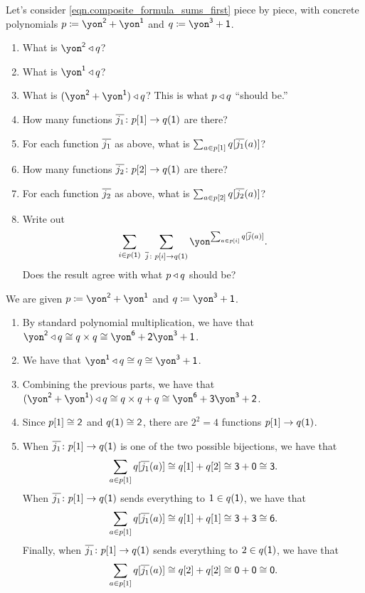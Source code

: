 \documentclass[Book-Poly]{subfiles}
\begin{document}
\begin{exercise}
Let's consider \eqref{eqn.composite_formula_sums_first} piece by piece, with concrete polynomials $p\coloneqq\yon^\2+\yon^\1$ and $q\coloneqq \yon^\3+\1$.
\begin{enumerate}
	\item What is $\yon^\2\tri q$?
	\item What is $\yon^\1\tri q$?
	\item What is $(\yon^\2+\yon^\1)\tri q$? This is what $p\mathbin{\triangleleft} q$ ``should be.''
	\item How many functions $\overline{j_1}\colon p[1]\to q(\textsf{1})$ are there?
	\item For each function $\overline{j_1}$ as above, what is $\sum_{a\in p[1]} q[\overline{j_1}(a)]$?
	\item How many functions $\overline{j_2}\colon p[2]\to q(\textsf{1})$ are there?
	\item For each function $\overline{j_2}$ as above, what is $\sum_{a\in p[2]} q[\overline{j_2}(a)]$?
	\item Write out \[\sum_{i\in p(\1)}\;\sum_{\ol{j}\colon p[i]\to q(\1)}\yon^{\sum_{a\in p[i]}q[\ol{j}(a)]}.\]
	Does the result agree with what $p\mathbin{\triangleleft} q$ should be?
\qedhere
\end{enumerate}
\begin{solution}
We are given $p\coloneqq\yon^\2+\yon^\1$ and $q\coloneqq \yon^\3+\1$.
\begin{enumerate}
    \item By standard polynomial multiplication, we have that $\yon^\2 \tri q \iso q \times q \iso \yon^\6 + \2\yon^\3 + \1$.
    \item We have that $\yon^\1 \tri q \iso q \iso \yon^\3 + \1$.
    \item Combining the previous parts, we have that $(\yon^\2 + \yon^\1) \tri q \iso q \times q + q \iso \yon^\6 + \3\yon^\3 + \2$.
    \item Since $p[1] \cong \textsf{2}$ and $q(\textsf{1}) \cong \textsf{2}$, there are $2^2 = 4$ functions $p[1] \to q(\textsf{1})$.
    \item When $\overline{j_1} \colon p[1] \to q(\textsf{1})$ is one of the two possible bijections, we have that
    \[
        \sum_{a \in p[1]} q[\overline{j_1}(a)] \cong q[1] + q[2] \cong \textsf{3} + \textsf{0} \cong \textsf{3}.
    \]
    When $\overline{j_1} \colon p[1] \to q(\textsf{1})$ sends everything to $1 \in q(\textsf{1})$, we have that
    \[
        \sum_{a \in p[1]} q[\overline{j_1}(a)] \cong q[1] + q[1] \cong \textsf{3} + \textsf{3} \cong \textsf{6}.
    \]
    Finally, when $\overline{j_1} \colon p[1] \to q(\textsf{1})$ sends everything to $2 \in q(\textsf{1})$, we have that
    \[
        \sum_{a \in p[1]} q[\overline{j_1}(a)] \cong q[2] + q[2] \cong \textsf{0} + \textsf{0} \cong \textsf{0}.
\]
\end{enumerate}
\end{solution}
\end{exercise}
\end{document}
